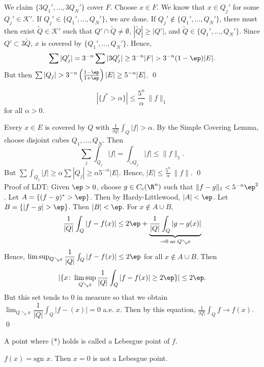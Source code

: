 We claim $\{ 3Q_1', \ldots, 3Q_N' \}$ cover $F$. Choose $x \in F$. We know that $x \in Q_j'$ for some $Q_j' \in \mathcal{K}'$. If $Q_j' \in \{Q_1', \ldots, Q_N' \}$, we are done. If $Q_j' \notin \{Q_1', \ldots, Q_N' \}$, there must then exist $\tilde{Q} \in \mathcal{K}'$ such that $Q' \cap \tilde{Q} \neq \emptyset$, $|\tilde{Q}| \geq |Q'|$, and $\tilde{Q} \in \{Q_1', \ldots, Q_N' \}$. Since $Q' \subset 3\tilde{Q}$, $x$ is covered by $\{Q_1', \ldots, Q_N' \}$. Hence, 
	\[
	\sum |Q_j'| = 3^{-n} \sum |3Q_j'| \geq 3^{-n} |F| > 3^{-n} (1-\ep) |E|.
	\] 
But then $\sum |Q_j| > 3^{-n} \left(\frac{1-\ep}{1+\ep}\right) |E| \geq 5^{-n} |E|$. \qed \\

	
\begin{thm}
	\[
	|\{ f^* > \alpha \}| \leq \dfrac{5^n}{\alpha} \, \|f\|_1
	\]
for all $\alpha>0$. 
\end{thm}

\pf Every $x \in E$ is covered by $Q$ with $\frac{1}{|Q|} \int_Q |f| > \alpha$. By the Simple Covering Lemma, choose disjoint cubes $Q_1,\ldots, Q_N$. Then
	\[
	\sum_j \int_{Q_j} |f| = \int_{\cup Q_j} |f| \leq \| f \|_1.
	\]
But $\sum \int_{Q_j} |f| \geq \alpha \sum |Q_j| \geq \alpha 5^{-n} |E|$. Hence, $|E| \leq \frac{5^n}{\alpha} \, \|f\|$. \qed \\




Proof of LDT: Given $\ep>0$, choose $g \in C_c(\R^n)$ such that $\| f - g \|_1< 5^{-n} \ep^2$. Let $A= \{ (f-g)^* > \ep \}$. Then by Hardy-Littlewood, $|A|<\ep$. Let $B= \{ |f-g|>\ep \}$. Then $|B|<\ep$. For $x \notin A \cup B$, 
	\[
	\dfrac{1}{|Q|} \int_Q |f-f(x)| \leq 2\ep + \underbrace{\dfrac{1}{|Q|} \int_Q |g-g(x)|}_{\to 0 \text{ as } Q \searrow x}
	\]
Hence, $\limsup_{Q \searrow x} \dfrac{1}{|Q|} \int_Q |f-f(x)| \leq 2 \ep$ for all $x \notin A \cup B$. Then 
	\[
	|\{ x \colon \limsup_{Q \searrow x} \dfrac{1}{|Q|} \int_Q |f-f(x)| \geq 2 \ep\}| \leq 2 \ep.
	\] %
But this set tends to 0 in measure so that we obtain $\lim_{Q \searrow x} \dfrac{1}{|Q|} \int_Q |f-(x)|= 0$ a.e. $x$. Then by this equation, $\frac{1}{|Q|} \int_Q f \to f(x)$. \qed \\


\begin{rem}
A point where (*) holds is called a Lebesgue point of $f$. 
\end{rem}

\begin{ex}
$f(x)= \text{sgn } x$. Then $x=0$ is not a Lebesgue point. 
\end{ex}


